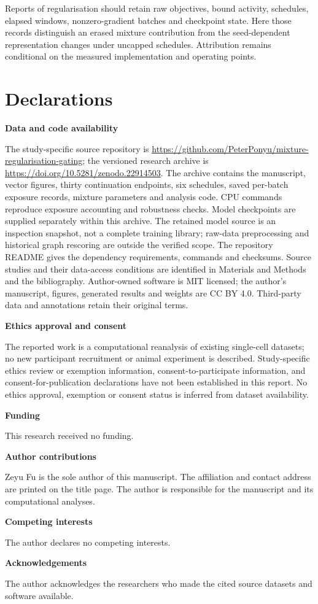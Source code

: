 \documentclass[11pt]{article}
\begin{document}
Reports of regularisation should retain raw objectives, bound activity, schedules, elapsed windows, nonzero-gradient batches and checkpoint state. Here those records distinguish an erased mixture contribution from the seed-dependent representation changes under uncapped schedules. Attribution remains conditional on the measured implementation and operating points.

\FloatBarrier
\section{Declarations}
\noindent\textbf{Data and code availability}\par\nobreak
The study-specific source repository is \url{https://github.com/PeterPonyu/mixture-regularisation-gating}; the versioned research archive is \url{https://doi.org/10.5281/zenodo.22914503}. The archive contains the manuscript, vector figures, thirty continuation endpoints, six schedules, saved per-batch exposure records, mixture parameters and analysis code. CPU commands reproduce exposure accounting and robustness checks. Model checkpoints are supplied separately within this archive. The retained model source is an inspection snapshot, not a complete training library; raw-data preprocessing and historical graph rescoring are outside the verified scope. The repository README gives the dependency requirements, commands and checksums. Source studies and their data-access conditions are identified in Materials and Methods and the bibliography. Author-owned software is MIT licensed; the author's manuscript, figures, generated results and weights are CC BY 4.0. Third-party data and annotations retain their original terms.

\noindent\textbf{Ethics approval and consent}\par\nobreak
The reported work is a computational reanalysis of existing single-cell datasets; no new participant recruitment or animal experiment is described. Study-specific ethics review or exemption information, consent-to-participate information, and consent-for-publication declarations have not been established in this report. No ethics approval, exemption or consent status is inferred from dataset availability.

\noindent\textbf{Funding}\par\nobreak
This research received no funding.

\noindent\textbf{Author contributions}\par\nobreak
Zeyu Fu is the sole author of this manuscript. The affiliation and contact address are printed on the title page. The author is responsible for the manuscript and its computational analyses.

\noindent\textbf{Competing interests}\par\nobreak
The author declares no competing interests.

\noindent\textbf{Acknowledgements}\par\nobreak
The author acknowledges the researchers who made the cited source datasets and software available.

{}
\end{document}
